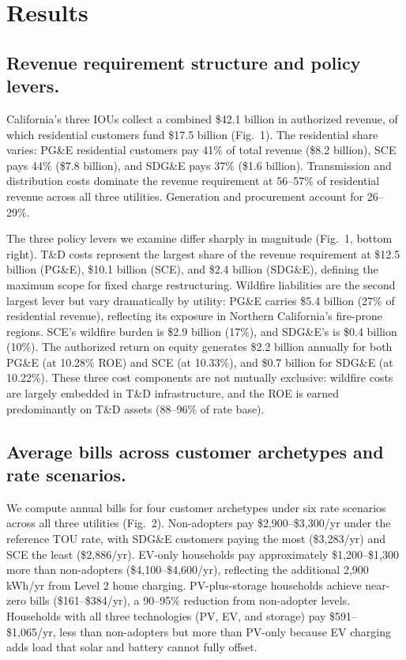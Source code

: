 \documentclass[11pt]{article}
\begin{document}
\section*{Results}

\subsection*{Revenue requirement structure and policy levers.}

California's three IOUs collect a combined \$42.1 billion in authorized revenue, of which residential customers fund \$17.5 billion (Fig.~1). The residential share varies: PG\&E residential customers pay 41\% of total revenue (\$8.2 billion), SCE pays 44\% (\$7.8 billion), and SDG\&E pays 37\% (\$1.6 billion). Transmission and distribution costs dominate the revenue requirement at 56--57\% of residential revenue across all three utilities. Generation and procurement account for 26--29\%.

The three policy levers we examine differ sharply in magnitude (Fig.~1, bottom right). T\&D costs represent the largest share of the revenue requirement at \$12.5 billion (PG\&E), \$10.1 billion (SCE), and \$2.4 billion (SDG\&E), defining the maximum scope for fixed charge restructuring. Wildfire liabilities are the second largest lever but vary dramatically by utility: PG\&E carries \$5.4 billion (27\% of residential revenue), reflecting its exposure in Northern California's fire-prone regions. SCE's wildfire burden is \$2.9 billion (17\%), and SDG\&E's is \$0.4 billion (10\%). The authorized return on equity generates \$2.2 billion annually for both PG\&E (at 10.28\% ROE) and SCE (at 10.33\%), and \$0.7 billion for SDG\&E (at 10.22\%). These three cost components are not mutually exclusive: wildfire costs are largely embedded in T\&D infrastructure, and the ROE is earned predominantly on T\&D assets (88--96\% of rate base).

\subsection*{Average bills across customer archetypes and rate scenarios.}

We compute annual bills for four customer archetypes under six rate scenarios across all three utilities (Fig.~2). Non-adopters pay \$2,900--\$3,300/yr under the reference TOU rate, with SDG\&E customers paying the most (\$3,283/yr) and SCE the least (\$2,886/yr). EV-only households pay approximately \$1,200--\$1,300 more than non-adopters (\$4,100--\$4,600/yr), reflecting the additional 2,900 kWh/yr from Level 2 home charging. PV-plus-storage households achieve near-zero bills (\$161--\$384/yr), a 90--95\% reduction from non-adopter levels. Households with all three technologies (PV, EV, and storage) pay \$591--\$1,065/yr, less than non-adopters but more than PV-only because EV charging adds load that solar and battery cannot fully offset.
\end{document}
